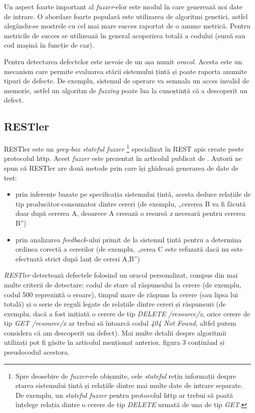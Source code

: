 Un aspect foarte important al \textit{fuzzer}-elor este modul în care generează noi date de intrare. O abordare foarte populară este utilizarea de algoritmi genetici, astfel alegându-se mostrele cu cel mai mare succes raportat de o anume metrică. Pentru metricile de succes se utilizează în general acoperirea totală a codului (sursă sau cod mașină în funcție de caz).

Pentru detectarea defectelor este nevoie de un așa numit \textit{oracol}. Acesta este un mecanism care permite evaluarea stării sistemului țintă și poate raporta anumite tipuri de defecte. De exemplu, sistemul de operare va semnala un acces invalid de memorie, astfel un algoritm de \textit{fuzzing} poate lua la cunoștință că a descoperit un defect.

\subsection*{RESTler}

RESTler este un \textit{grey-box stateful fuzzer} \footnote{Spre deosebire de \textit{fuzzer}-ele obișnuite, cele \textit{stateful} rețin informații despre starea sistemului țintă și relațiile dintre mai multe date de intrare separate. De exemplu, un \textit{stateful fuzzer} pentru protocolul \acrshort{http} ar trebui să poată înțelege relația dintre o cerere de tip \textit{DELETE} urmată de una de tip \textit{GET}.} specializat în REST \acrshort{api}s create peste protocolul \acrshort{http}. Acest \textit{fuzzer} este prezentat în articolul publicat de \citet{Atlidakis2019}. Autorii ne spun că RESTler are două metode prin care își ghidează generarea de date de test:

\begin{itemize}
    \item prin inferențe bazate pe specificația sistemului țintă, acesta deduce relațiile de tip producător-consumator dintre cereri (de exemplu, „cererea B va fi făcută doar după cererea A, deoarece A creează o resursă \textit{x} necesară pentru cererea B”)
    \item prin analizarea \textit{feedback}-ului primit de la sistemul țintă pentru a determina ordinea corectă a cererilor (de exemplu, „cerea C este refuzată dacă nu este efectuată strict după lanț de cereri A,B”)
\end{itemize}

\textit{RESTler} detectează defectele folosind un oracol personalizat, compus din mai multe criterii de detectare: codul de stare al răspunsului la cerere (de exemplu, codul 500 reprezintă o eroare), timpul mare de răspuns la cerere (sau lipsa lui totală) și o serie de reguli legate de relațiile dintre cereri și răspunsuri (de exemplu, dacă a fost inițiată o cerere de tip \textit{DELETE /resource/x}, orice cerere de tip \textit{GET /resource/x} ar trebui să întoarcă codul \textit{404 Not Found}, altfel putem considera că am descoperit un defect). Mai multe detalii despre algoritmii utilizați pot fi găsite în articolul menționat anterior, figura 3 conținând și pseudocodul acestora.

